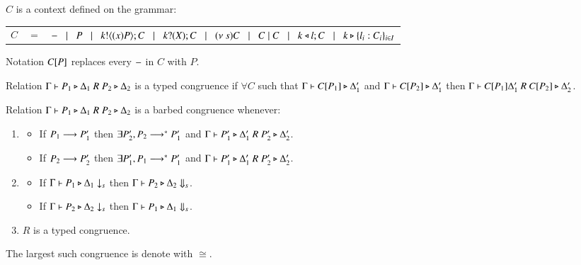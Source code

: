 \begin{definition}[Context]
	$C$ is a context defined on the grammar:

	\begin{tabular}{rcl}
		$C$ &$=$& $- \;\;\;|\;\;\; P \;\;\;|\;\;\; k ! \langle (x)P \rangle ; C \;\;\;|\;\;\; k ? (X) ; C \;\;\;|\;\;\; (\nu\ s) C \;\;\;|\;\;\; C \;|\; C \;\;\;|\;\;\; k \triangleleft l ; C \;\;\;|\;\;\; k \triangleright \{l_i:C_i\}_{i \in I}$
	\end{tabular}
	Notation $C[P]$ replaces every $-$ in $C$ with $P$.
\end{definition}

\begin{definition}
	Relation $\Gamma \vdash P_1 	\triangleright \Delta_1\ R\ P_2 \triangleright \Delta_2$ is a typed congruence if
	$\forall C$ such that $\Gamma \vdash C[P_1] \triangleright \Delta_1'$ and
	$\Gamma \vdash C[P_2] \triangleright \Delta_1'$ then
	$\Gamma \proves \context{C}{P_1} \Delta_1'\ R\ \context{C}{P_2} \hastype \Delta_2'$.
\end{definition}

\begin{definition}
	Relation $\Gamma \vdash P_1 \triangleright \Delta_1\ R\ P_2 \triangleright \Delta_2$ is a barbed congruence
	whenever:
	\begin{enumerate}
		\item
		\begin{itemize}
			\item	If $P_1 \longrightarrow P_1'$ then $\exists P_2', P_2 \longrightarrow^* P_1'$ and $\Gamma \vdash P_1' \triangleright \Delta_1'\ R\ P_2' \triangleright \Delta_2'$.
			\item	If $P_2 \longrightarrow P_2'$ then $\exists P_1', P_1 \longrightarrow^* P_1'$ and $\Gamma \vdash P_1' \triangleright \Delta_1'\ R\ P_2' \triangleright \Delta_2'$.
		\end{itemize}
		\item
		\begin{itemize}
			\item	If $\Gamma \vdash P_1 \triangleright \Delta_1 \downarrow_{s}$ then $\Gamma \vdash P_2 \triangleright \Delta_2 \Downarrow_{s}$.
			\item	If $\Gamma \vdash P_2 \triangleright \Delta_2 \downarrow_{s}$ then $\Gamma \vdash P_1 \triangleright \Delta_1 \Downarrow_{s}$.
		\end{itemize}
		\item	$R$ is a typed congruence.
	\end{enumerate}
	The largest such congruence is denote with $\cong$.
\end{definition}

